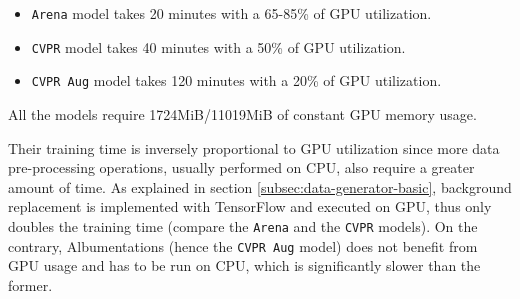 \begin{itemize}
    \item \texttt{Arena} model takes 20 minutes with a 65-85\% of GPU utilization.
    \item \texttt{CVPR} model takes 40 minutes with a 50\% of GPU utilization.
    \item \texttt{CVPR Aug} model takes 120 minutes with a 20\% of GPU utilization.
\end{itemize}

All the models require 1724MiB/11019MiB of constant GPU memory usage.

Their training time is inversely proportional to GPU utilization since more data pre-processing operations, usually performed on CPU, also require a greater amount of time. As explained in section \ref{subsec:data-generator-basic}, background replacement is implemented with TensorFlow and executed on GPU, thus only doubles the training time (compare the \texttt{Arena} and the \texttt{CVPR} models). On the contrary, Albumentations (hence the \texttt{CVPR Aug} model) does not benefit from GPU usage and has to be run on CPU, which is significantly slower than the former.



